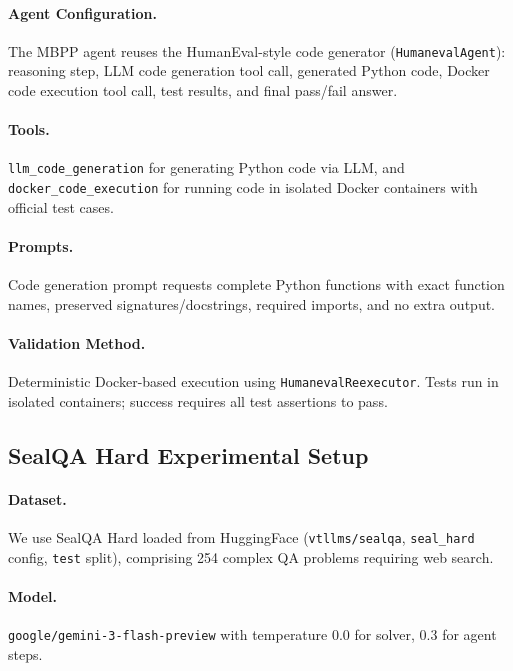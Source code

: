 \documentclass{article}
\theoremstyle{plain}
\theoremstyle{definition}
\theoremstyle{remark}
\begin{document}
\paragraph{Agent Configuration.}
The MBPP agent reuses the HumanEval-style code generator (\texttt{HumanevalAgent}): reasoning step, LLM code generation tool call, generated Python code, Docker code execution tool call, test results, and final pass/fail answer.

\paragraph{Tools.}
\texttt{llm\_code\_generation} for generating Python code via LLM, and \texttt{docker\_code\_execution} for running code in isolated Docker containers with official test cases.

\paragraph{Prompts.}
Code generation prompt requests complete Python functions with exact function names, preserved signatures/docstrings, required imports, and no extra output.

\paragraph{Validation Method.}
Deterministic Docker-based execution using \texttt{HumanevalReexecutor}. Tests run in isolated containers; success requires all test assertions to pass.

\subsection{SealQA Hard Experimental Setup}

\paragraph{Dataset.}
We use SealQA Hard \cite{pham2025sealqa} loaded from HuggingFace (\texttt{vtllms/sealqa}, \texttt{seal\_hard} config, \texttt{test} split), comprising 254 complex QA problems requiring web search.

\paragraph{Model.}
\texttt{google/gemini-3-flash-preview} with temperature 0.0 for solver, 0.3 for agent steps.
\end{document}
